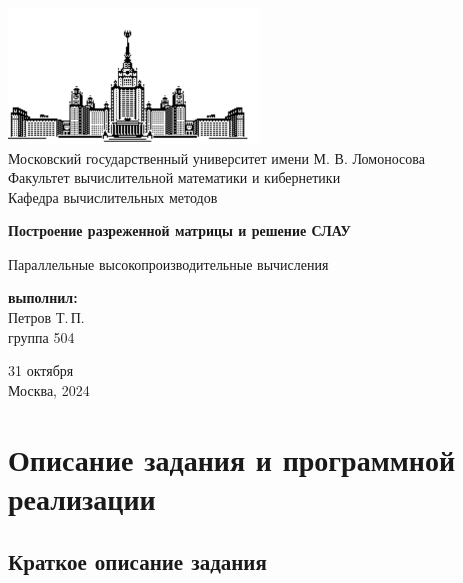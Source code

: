 \documentclass[12pt, a4paper]{article}
\begin{document}
	
\thispagestyle{empty}

\begin{center}
	\ \vspace{-3cm}
	
	\includegraphics[width=0.5\textwidth]{msu-eps-converted-to.pdf}\\
	{Московский государственный университет имени М. В. Ломоносова}\\
	Факультет вычислительной математики и кибернетики\\
	Кафедра вычислительных методов
	
	\vspace{6cm}
	
	{\Large \bfseries Построение разреженной матрицы и решение СЛАУ}
	
	\vspace{1cm}
	
	{\large Параллельные высокопроизводительные вычисления}
\end{center}

\vfill

\begin{flushright}
	\textbf{выполнил:}\\
	Петров Т.\,П. \\
	группа 504
\end{flushright}

\vfill

\begin{center}
	31 октября \\
	Москва, 2024
\end{center}

\enlargethispage{2\baselineskip}

\newpage

\tableofcontents

\newpage

\section{Описание задания и программной реализации}
\subsection{Краткое описание задания}
\end{document}
